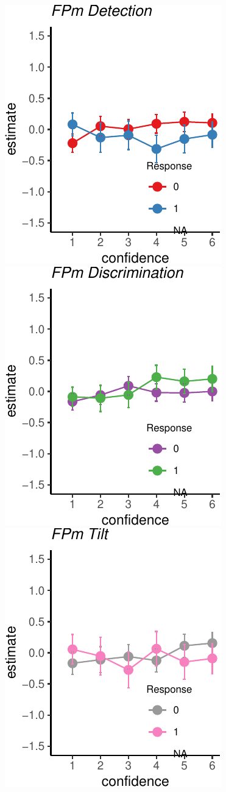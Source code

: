 \documentclass[]{article}
\begin{document}
\includegraphics{Chudi-Thesis_files/figure-latex/mixed_effects-13.pdf}
\includegraphics{Chudi-Thesis_files/figure-latex/mixed_effects-14.pdf}
\includegraphics{Chudi-Thesis_files/figure-latex/mixed_effects-15.pdf} ~
\end{document}
